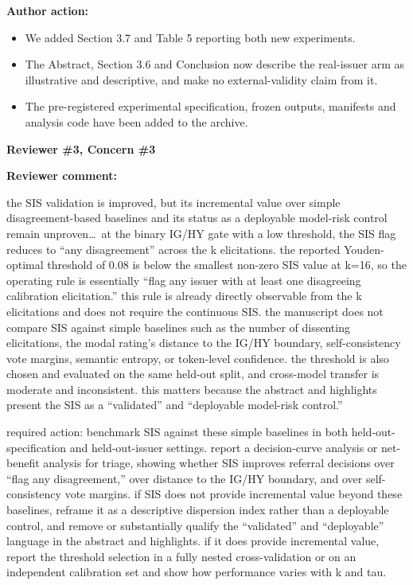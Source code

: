 \documentclass[11pt]{article}
\newcommand{\rvcomment}[1]{{\color{ReviewerGreen}#1}}
\newcommand{\concern}[1]{\textbf{\color{ReviewerGreen}#1}}
\begin{document}
\textbf{Author action:}

\begin{itemize}
\item We added Section 3.7 and Table 5 reporting both new experiments.
\item The Abstract, Section 3.6 and Conclusion now describe the real-issuer arm as illustrative and descriptive, and make no external-validity claim from it.
\item The pre-registered experimental specification, frozen outputs, manifests and analysis code have been added to the archive.
\end{itemize}

\vspace{4pt}

\concern{Reviewer \#3, Concern \#3}

\concern{Reviewer comment:}

\rvcomment{the SIS validation is improved, but its incremental value over simple
disagreement-based baselines and its status as a deployable model-risk control remain unproven\dots\
at the binary IG/HY gate with a low threshold, the SIS flag reduces to ``any disagreement'' across
the k elicitations. the reported Youden-optimal threshold of 0.08 is below the smallest non-zero SIS
value at k=16, so the operating rule is essentially ``flag any issuer with at least one disagreeing
calibration elicitation.'' this rule is already directly observable from the k elicitations and does
not require the continuous SIS. the manuscript does not compare SIS against simple baselines such as
the number of dissenting elicitations, the modal rating's distance to the IG/HY boundary,
self-consistency vote margins, semantic entropy, or token-level confidence. the threshold is also
chosen and evaluated on the same held-out split, and cross-model transfer is moderate and
inconsistent. this matters because the abstract and highlights present the SIS as a ``validated'' and
``deployable model-risk control.''}

\rvcomment{required action: benchmark SIS against these simple baselines in both
held-out-specification and held-out-issuer settings. report a decision-curve analysis or net-benefit
analysis for triage, showing whether SIS improves referral decisions over ``flag any disagreement,''
over distance to the IG/HY boundary, and over self-consistency vote margins. if SIS does not provide
incremental value beyond these baselines, reframe it as a descriptive dispersion index rather than a
deployable control, and remove or substantially qualify the ``validated'' and ``deployable'' language
in the abstract and highlights. if it does provide incremental value, report the threshold selection
in a fully nested cross-validation or on an independent calibration set and show how performance
varies with k and tau.}
\end{document}

